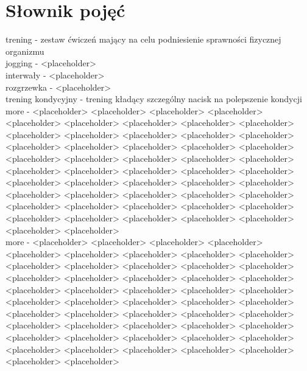 \documentclass[11pt,wide]{mwart}
\begin{document}
\section{\Large Słownik pojęć}
\begin{minipage}{0.45\textwidth}
  {\emph \large trening} - zestaw ćwiczeń mający na celu podniesienie sprawności fizycznej organizmu \\
  {\emph \large jogging} - <placeholder>\\
  {\emph \large interwały} - <placeholder>\\
  {\emph \large rozgrzewka} - <placeholder>\\
  {\emph \large trening kondycyjny} -  trening kładący szczególny nacisk na polepszenie kondycji\\
  {\emph \large more} - <placeholder> <placeholder> <placeholder> <placeholder> <placeholder> <placeholder> <placeholder> <placeholder> <placeholder> <placeholder> <placeholder> <placeholder> <placeholder> <placeholder> <placeholder> <placeholder> <placeholder> <placeholder> <placeholder> <placeholder> <placeholder> <placeholder> <placeholder> <placeholder> <placeholder> <placeholder> <placeholder> <placeholder> <placeholder> <placeholder> <placeholder> <placeholder> <placeholder> <placeholder> <placeholder> <placeholder> <placeholder> <placeholder> <placeholder> <placeholder> <placeholder> <placeholder> <placeholder> <placeholder> <placeholder> <placeholder> <placeholder> <placeholder> <placeholder> <placeholder> <placeholder> \\
  {\emph \large more} - <placeholder> <placeholder> <placeholder> <placeholder> <placeholder> <placeholder> <placeholder> <placeholder> <placeholder> <placeholder> <placeholder> <placeholder> <placeholder> <placeholder> <placeholder> <placeholder> <placeholder> <placeholder> <placeholder> <placeholder> <placeholder> <placeholder> <placeholder> <placeholder> <placeholder> <placeholder> <placeholder> <placeholder> <placeholder> <placeholder> <placeholder> <placeholder> <placeholder> <placeholder> <placeholder> <placeholder> <placeholder> <placeholder> <placeholder> <placeholder> <placeholder> <placeholder> <placeholder> <placeholder> <placeholder> <placeholder> <placeholder> <placeholder> <placeholder> <placeholder> <placeholder> \\
\end{minipage}
\end{document}
